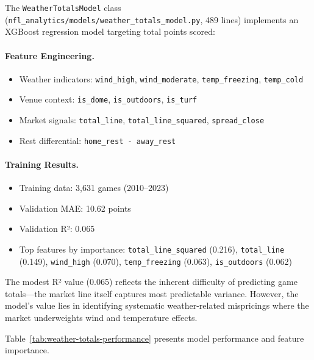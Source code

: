 The \texttt{WeatherTotalsModel} class (\texttt{nfl\_analytics/models/weather\_totals\_model.py}, 489 lines) implements an XGBoost regression model targeting total points scored:

\paragraph{Feature Engineering.}
\begin{itemize}
  \item Weather indicators: \texttt{wind\_high}, \texttt{wind\_moderate}, \texttt{temp\_freezing}, \texttt{temp\_cold}
  \item Venue context: \texttt{is\_dome}, \texttt{is\_outdoors}, \texttt{is\_turf}
  \item Market signals: \texttt{total\_line}, \texttt{total\_line\_squared}, \texttt{spread\_close}
  \item Rest differential: \texttt{home\_rest - away\_rest}
\end{itemize}

\paragraph{Training Results.}
\begin{itemize}
  \item Training data: 3,631 games (2010--2023)
  \item Validation MAE: 10.62 points
  \item Validation R²: 0.065
  \item Top features by importance: \texttt{total\_line\_squared} (0.216), \texttt{total\_line} (0.149), \texttt{wind\_high} (0.070), \texttt{temp\_freezing} (0.063), \texttt{is\_outdoors} (0.062)
\end{itemize}

The modest R² value (0.065) reflects the inherent difficulty of predicting game totals---the market line itself captures most predictable variance. However, the model's value lies in identifying systematic weather-related mispricings where the market underweights wind and temperature effects.

Table~\ref{tab:weather-totals-performance} presents model performance and feature importance.

